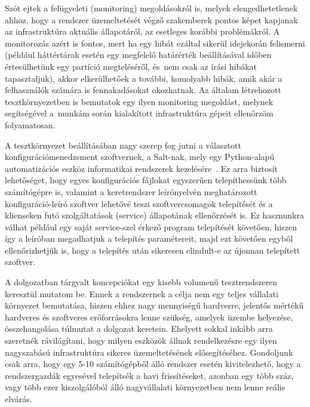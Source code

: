 Szót ejtek a felügyeleti (monitoring) megoldásokról is, melyek elengedhetetlenek ahhoz, hogy a rendszer üzemeltetését végző szakemberek pontos képet kapjanak az infrastruktúra aktuális állapotáról, az esetleges korábbi problémákról. A monitorozás azért is fontos, mert ha egy hibát ezáltal sikerül idejekorán felismerni (például háttértárak esetén egy megfelelő határérték beállításával időben értesülhetünk egy partíció megteléséről, és~nem csak az írási hibákat tapasztaljuk), akkor elkerülhetőek a további, komolyabb hibák, amik akár a felhasználók számára is fennakadásokat okozhatnak. Az általam létrehozott tesztkörnyezetben is bemutatok egy ilyen monitoring megoldást, melynek segítségével a~munkám során kialakított infrastruktúra gépeit ellenőrzöm folyamatosan.

A tesztkörnyezet beállításában nagy szerep fog jutni a választott konfigurációmenedzsment szoftvernek, a Salt-nak, mely egy Python-alapú automatizációs eszköz informatikai rendszerek kezelésére~\cite{SaltAbout}. Ez arra biztosít lehetőséget, hogy egyes konfigurációs \mbox{fájlokat} egyszerűen telepíthessünk több számítógépre is, valamint a keretrendszer leírónyelvén meghatározott konfiguráció-leíró szoftver lehetővé teszi szoftvercsomagok telepítését és a klienseken futó szolgáltatások (service) állapotának ellenőrzését is. Ez hasznunkra válhat például egy saját service-szel érkező program telepítését követően, hiszen így a leíróban megadhatjuk a telepítés paramétereit, majd ezt követően egyből ellenőrizhetjük is, hogy a telepítés után sikeresen elindult-e az újonnan telepített szoftver.


A dolgozatban tárgyalt koncepciókat egy kisebb volumenű tesztrendszeren keresztül mutatom be. Ennek a rendszernek a célja nem egy teljes vállalati környezet bemutatása, hiszen ehhez nagy mennyiségű hardverre, jelentős mértékű hardveres és szoftveres erőforrásokra lenne szükség, amelyek üzembe helyezése, összehangolása túlmutat a dolgozat keretein.
Ehelyett sokkal inkább arra szeretnék rávilágítani, hogy milyen eszközök állnak rendelkezésre egy ilyen nagyszabású infrastruktúra sikeres üzemeltetésének elősegítéséhez. Gondoljunk csak arra, hogy egy 5-10 számítógépből álló rendszer esetén kivitelezhető, hogy a rendszergazdák egyesével telepítsék a havi frissítéseket, azonban egy több száz, vagy több ezer kiszolgálóból álló nagyvállalati környezetben nem lenne reális elvárás.

